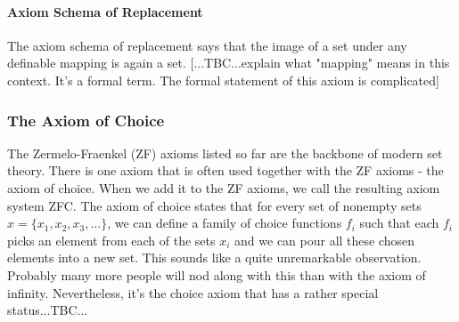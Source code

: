 
\paragraph{Axiom Schema of Replacement} The axiom schema of replacement says that the image of a set under any definable mapping is again a set. [...TBC...explain what "mapping" means in this context. It's a formal term. The formal statement of this axiom is complicated]


\subsubsection{The Axiom of Choice}
The Zermelo-Fraenkel (ZF) axioms listed so far are the backbone of modern set theory. There is one axiom that is often used together with the ZF axioms - the axiom of choice. When we add it to the ZF axioms, we call the resulting axiom system ZFC. The axiom of choice states that for every set of nonempty sets $x = \{ x_1, x_2, x_3, \ldots \}$, we can define a family of choice functions $f_i$ such that each $f_i$ picks an element from each of the sets $x_i$ and we can pour all these chosen elements into a new set. This sounds like a quite unremarkable observation. Probably many more people will nod along with this than with the axiom of infinity. Nevertheless, it's the choice axiom that has a rather special status...TBC...





